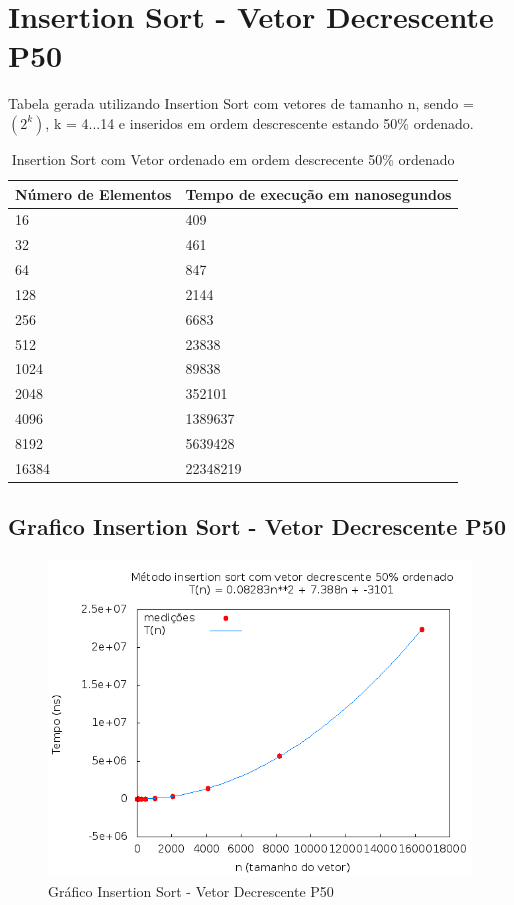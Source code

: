 \documentclass[12pt,a4paper,twoside]{report}
\begin{document}
\section{Insertion Sort - Vetor Decrescente P50}
Tabela gerada utilizando Insertion Sort com vetores de tamanho n, sendo = $(2^k)$, k = 4...14 e inseridos em ordem descrescente estando 50\% ordenado.

\begin{table}[H]
\centering
\caption{Insertion Sort com Vetor ordenado em ordem descrecente 50\% ordenado}
\label{my-label}
\begin{tabular}{|l|l|}
\hline
\multicolumn{1}{|c|}{\textbf{Número de Elementos}} & \multicolumn{1}{c|}{\textbf{Tempo de execução em nanosegundos}} \\ \hline
16 & 409 \\ \hline
32 & 461 \\ \hline
64 & 847 \\ \hline
128 & 2144 \\ \hline
256 & 6683 \\ \hline
512 & 23838 \\ \hline
1024 & 89838 \\ \hline
2048 & 352101 \\ \hline
4096 & 1389637 \\ \hline
8192 & 5639428 \\ \hline
16384 & 22348219 \\ \hline
\end{tabular}
\end{table}

\subsection{Grafico Insertion Sort - Vetor Decrescente P50}
\begin{figure}[H]
    \centering
    \includegraphics[width=0.7\linewidth]{graficos/Insertion/vIntDecrescenteP50/vIntDecrescenteP50.png}
  \caption{Gráfico Insertion Sort - Vetor Decrescente P50}
\end{figure}
\end{document}
